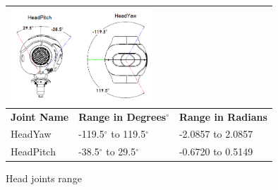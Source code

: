 \begin{figure}
\begin{tabular}{|p{5cm}|p{5cm}|p{5cm}|}
\multicolumn{3}{p{15cm}}{\centering \includegraphics[height = 3.5cm]{Figures/headjoints.png}} \\ \hline
\textbf{Joint Name} & \textbf{Range in Degrees$^{\circ}$} & \textbf{Range in Radians} \\ \hline
HeadYaw & -119.5$^{\circ}$ to 119.5$^{\circ}$ & -2.0857 to 2.0857 \\ \hline
HeadPitch & -38.5$^{\circ}$ to 29.5$^{\circ}$ & -0.6720 to 0.5149 \\ \hline
\end{tabular}
\caption{Head joints range}
\label{fig:hjoints}
\end{figure}

